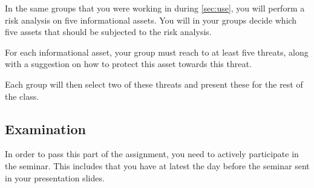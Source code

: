 \documentclass[a4paper]{llncs}
\begin{document}
In the same groups that you were working in during \ref{sec:use}, you will
perform a risk analysis on five informational assets. You will in your groups
decide which five assets that should be subjected to the risk analysis.

For each informational asset, your group must reach to at least five threats,
along with a suggestion on how to protect this asset towards this threat.

Each group will then select two of these threats and present these for the
rest of the class.

\subsection{Examination}
\label{sec:examination}

In order to pass this part of the assignment, you need to actively participate
in the seminar. This includes that you have at latest the day before the seminar
sent in your presentation slides.

\printbibliography{}
\end{document}
